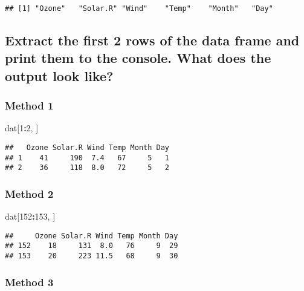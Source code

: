\documentclass[]{article}
\newenvironment{Shaded}{\begin{snugshade}}{\end{snugshade}}
\newcommand{\DecValTok}[1]{\textcolor[rgb]{0.00,0.00,0.81}{#1}}
\newcommand{\NormalTok}[1]{#1}
\newcommand{\OperatorTok}[1]{\textcolor[rgb]{0.81,0.36,0.00}{\textbf{#1}}}
\begin{document}
\begin{verbatim}
## [1] "Ozone"   "Solar.R" "Wind"    "Temp"    "Month"   "Day"
\end{verbatim}

\hypertarget{extract-the-first-2-rows-of-the-data-frame-and-print-them-to-the-console.-what-does-the-output-look-like}{%
\subsection{Extract the first 2 rows of the data frame and print them to
the console. What does the output look
like?}\label{extract-the-first-2-rows-of-the-data-frame-and-print-them-to-the-console.-what-does-the-output-look-like}}

\hypertarget{method-1}{%
\subsubsection{Method 1}\label{method-1}}

\begin{Shaded}
\begin{Highlighting}[]
\NormalTok{dat[}\DecValTok{1}\OperatorTok{:}\DecValTok{2}\NormalTok{, ]}
\end{Highlighting}
\end{Shaded}

\begin{verbatim}
##   Ozone Solar.R Wind Temp Month Day
## 1    41     190  7.4   67     5   1
## 2    36     118  8.0   72     5   2
\end{verbatim}

\hypertarget{method-2-1}{%
\subsubsection{Method 2}\label{method-2-1}}

\begin{Shaded}
\begin{Highlighting}[]
\NormalTok{dat[}\DecValTok{152}\OperatorTok{:}\DecValTok{153}\NormalTok{, ]}
\end{Highlighting}
\end{Shaded}

\begin{verbatim}
##     Ozone Solar.R Wind Temp Month Day
## 152    18     131  8.0   76     9  29
## 153    20     223 11.5   68     9  30
\end{verbatim}

\hypertarget{method-3-1}{%
\subsubsection{Method 3}\label{method-3-1}}
\end{document}
